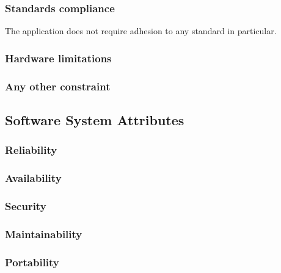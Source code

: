 \subsubsection{Standards compliance}
The application does not require adhesion to any standard in particular. 
\subsubsection{Hardware limitations}

\subsubsection{Any other constraint}


\subsection{Software System Attributes}

\subsubsection{Reliability}

\subsubsection{Availability}

\subsubsection{Security}

\subsubsection{Maintainability}

\subsubsection{Portability}
